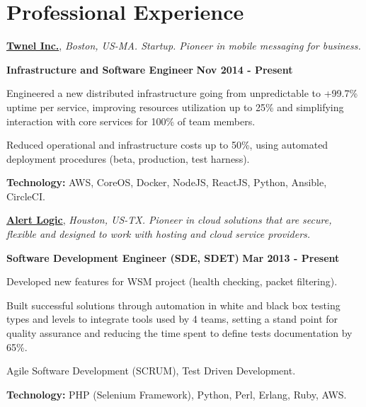 \section{Professional Experience}
%
\href{http://www.twnel.com/}{\textbf{Twnel Inc.}}, \textit{Boston, US-MA.
Startup.
Pioneer in mobile messaging for business.}

\begin{outerlist}
\item[\FA \faAngleDoubleRight] \textbf{Infrastructure and Software Engineer}
\hfill
\textbf{Nov 2014 - Present}
\end{outerlist}

\begin{innerlist}
\item Engineered a new distributed infrastructure going from
unpredictable to +99.7\% uptime per service, improving resources
utilization up to 25\% and simplifying interaction with core services for 100\%
of team members.
\item Reduced operational and infrastructure costs up to 50\%, using automated
deployment procedures (beta, production, test harness).
\item \textbf{Technology:} AWS, CoreOS, Docker, NodeJS, ReactJS, Python,
Ansible, CircleCI.
\end{innerlist}

\quarterblankline

\href{http://alertlogic.com/}{\textbf{Alert Logic}}, \textit{Houston, US-TX.
Pioneer in cloud solutions that are secure, flexible and designed to work with
hosting and cloud service providers.}

\begin{outerlist}
\item[\FA \faAngleDoubleRight] \textbf{Software Development Engineer (SDE,
SDET)}
\hfill
\textbf{Mar 2013 - Present}
\end{outerlist}

    \begin{innerlist}
\item Developed new features for WSM project (health checking, packet
filtering).
\item Built
successful solutions through automation in white and black box testing types and
levels to integrate tools used by 4 teams, setting a stand point for quality
assurance and reducing the time spent to define tests documentation by 65\%.
\item Agile Software Development (SCRUM), Test Driven Development.
\item \textbf{Technology:} PHP (Selenium Framework), Python, Perl, Erlang, Ruby,
AWS.
    \end{innerlist}


